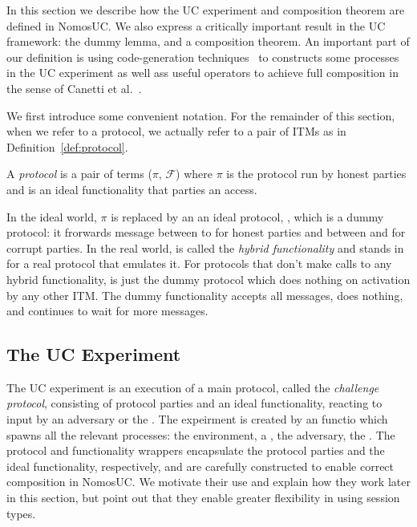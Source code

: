 In this section we describe how the UC experiment and composition theorem are defined in NomosUC.
We also express a critically important result in the UC framework: the dummy lemma, and a composition theorem.
An important part of our definition is using code-generation techniques~\cite{somecodegeneration} to constructs some processes in the UC experiment as well ass useful operators to achieve full composition in the sense of Canetti et al.~\cite{uc}.

We first introduce some convenient notation.
For the remainder of this section, when we refer to a protocol, we actually refer to a pair of ITMs as in Definition~\ref{def:protocol}.
\begin{definition}\label{def:protocol}
A \textit{protocol} is a pair of terms ($\pi$, $\mathcal{F}$) where $\pi$ is the protocol run by honest parties and \F is an ideal functionality that parties an access.
\end{definition}
In the ideal world, $\pi$ is replaced by an an ideal protocol, \idealP, which is a dummy protocol: it frorwards message between \Z to \F for honest parties  and between \A and \F for corrupt parties.
In the real world, \F is called the \textit{hybrid functionality} and stands in for a real protocol that emulates it.
For protocols that don't make calls to any hybrid functionality, \F is just the dummy protocol which does nothing on activation by any other ITM.
The dummy functionality accepts all messages, does nothing, and continues to wait for more messages.

\subsection{The UC Experiment}
The UC experiment is an execution of a main protocol, called the \textit{challenge protocol}, consisting of protocol parties and an ideal functionality, reacting to input by an adversary \A or the \Z.
The expeirment is created by an  functio which spawns all the relevant processes: the environment, a , the adversary, the .
The protocol and functionality wrappers encapsulate the protocol parties and the ideal functionality, respectively, and are carefully constructed to enable correct composition in NomosUC.
We motivate their use and explain how they work later in this section, but point out that they enable greater flexibility in using session types.

